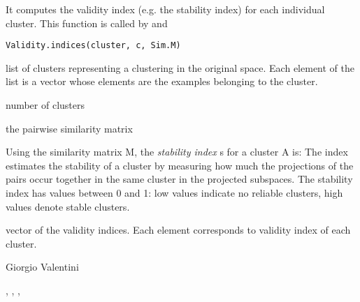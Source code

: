 \documentclass{article}
\begin{document}
\begin{Description}\relax
It computes the validity index (e.g. the stability index) for each individual cluster.
This function is  called by  and 
\end{Description}
\begin{Usage}
\begin{verbatim}
Validity.indices(cluster, c, Sim.M)
\end{verbatim}
\end{Usage}
\begin{Arguments}
\begin{ldescription}
\item[\code{cluster}] list of clusters representing a clustering in the original space. Each element of the list is a  
vector whose elements are the examples belonging to the cluster. 
\item[\code{c}] number of clusters 
\item[\code{Sim.M}] the pairwise similarity matrix 
\end{ldescription}
\end{Arguments}
\begin{Details}\relax
Using the  similarity matrix M, 
the \emph{stability index} s for a cluster A is:
The index  estimates the stability of a cluster  by measuring how much  the projections 
of the pairs  occur together in the same cluster in the projected subspaces. 
The stability index has values between 0 and 1: low values indicate no reliable clusters,
high values denote stable clusters.
\end{Details}
\begin{Value}
vector of the validity indices. Each element corresponds to validity index of each cluster.
\end{Value}
\begin{Author}\relax
Giorgio Valentini 
\end{Author}
\begin{SeeAlso}\relax
{},  ,
, 
\end{SeeAlso}
\end{document}
